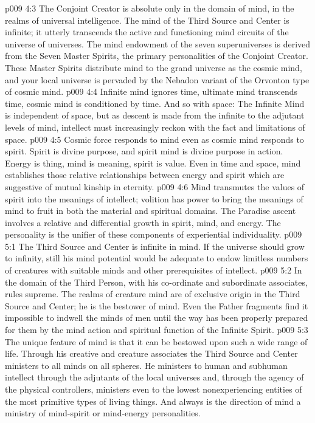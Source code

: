 \vs p009 4:3 \pc The Conjoint Creator is absolute only in the domain of mind, in the realms of universal intelligence. The mind of the Third Source and Center is infinite; it utterly transcends the active and functioning mind circuits of the universe of universes. The mind endowment of the seven superuniverses is derived from the Seven Master Spirits, the primary personalities of the Conjoint Creator. These Master Spirits distribute mind to the grand universe as the cosmic mind, and your local universe is pervaded by the Nebadon variant of the Orvonton type of cosmic mind.
\vs p009 4:4 Infinite mind ignores time, ultimate mind transcends time, cosmic mind is conditioned by time. And so with space: The Infinite Mind is independent of space, but as descent is made from the infinite to the adjutant levels of mind, intellect must increasingly reckon with the fact and limitations of space.
\vs p009 4:5 \pc Cosmic force responds to mind even as cosmic mind responds to spirit. Spirit is divine purpose, and spirit mind is divine purpose in action. Energy is thing, mind is meaning, spirit is value. Even in time and space, mind establishes those relative relationships between energy and spirit which are suggestive of mutual kinship in eternity.
\vs p009 4:6 Mind transmutes the values of spirit into the meanings of intellect; volition has power to bring the meanings of mind to fruit in both the material and spiritual domains. The Paradise ascent involves a relative and differential growth in spirit, mind, and energy. The personality is the unifier of these components of experiential individuality.
\vs p009 5:1 The Third Source and Center is infinite in mind. If the universe should grow to infinity, still his mind potential would be adequate to endow limitless numbers of creatures with suitable minds and other prerequisites of intellect.
\vs p009 5:2 In the domain of  the Third Person, with his co\hyp{}ordinate and subordinate associates, rules supreme. The realms of creature mind are of exclusive origin in the Third Source and Center; he is the bestower of mind. Even the Father fragments find it impossible to indwell the minds of men until the way has been properly prepared for them by the mind action and spiritual function of the Infinite Spirit.
\vs p009 5:3 The unique feature of mind is that it can be bestowed upon such a wide range of life. Through his creative and creature associates the Third Source and Center ministers to all minds on all spheres. He ministers to human and subhuman intellect through the adjutants of the local universes and, through the agency of the physical controllers, ministers even to the lowest nonexperiencing entities of the most primitive types of living things. And always is the direction of mind a ministry of mind\hyp{}spirit or mind\hyp{}energy personalities.
